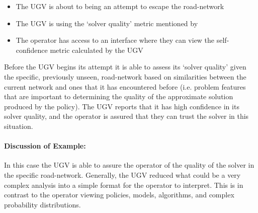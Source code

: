 \begin{itemize}
    \item The UGV is about to being an attempt to escape the road-network
    \item The UGV is using the `solver quality' metric mentioned by \citet{Aitken2016-fb}
    \item The operator has access to an interface where they can view the self-confidence metric calculated by the UGV
\end{itemize}

Before the UGV begins its attempt it is able to assess its `solver quality' given the specific, previously unseen, road-network based on similarities between the current network and ones that it has encountered before (i.e. problem features that are important to determining the quality of the approximate solution produced by the policy). The UGV reports that it has high confidence in its solver quality, and the operator is assured that they can trust the solver in this situation.

\paragraph{\textbf{Discussion of Example:}} In this case the UGV is able to assure the operator of the quality of the solver in the specific road-network. Generally, the UGV reduced what could be a very complex analysis into a simple format for the operator to interpret. This is in contrast to the operator viewing policies, models, algorithms, and complex probability distributions.
